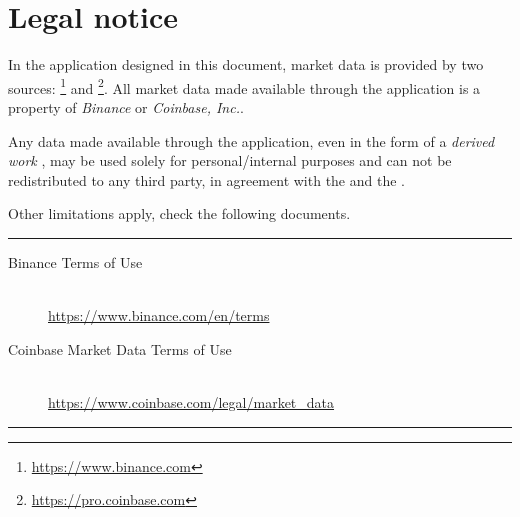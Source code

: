 \chapter{Legal notice}

In the application designed in this document, market data is provided by two
sources:
\footnote{\url{https://www.binance.com}}
and \footnote{\url{https://pro.coinbase.com}}. All market data made available
through the application is a property of \emph{Binance} or \emph{Coinbase,
Inc.}.

Any data made available through the application, even in the form of a
\emph{derived work} , may be used
solely for personal/internal purposes and can not be redistributed to any third
party, in agreement with the
 and the
.

Other limitations apply, check the following documents.

\vfill
\hrule
\large
\begin{description}
	\item[Binance Terms of Use]\hfill\\
		\url{https://www.binance.com/en/terms}
	\item[Coinbase Market Data Terms of Use]\hfill\\
		\url{https://www.coinbase.com/legal/market_data}
\end{description}
\normalsize
\hrule
\vfill
